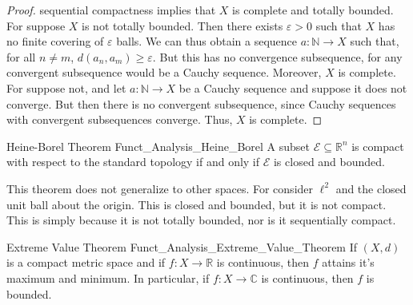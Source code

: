 \documentclass[crop=false,class=book,oneside]{standalone}                      %
\begin{document}
\begin{proof}
                sequential compactness implies that $X$ is
                complete and totally bounded. For suppose $X$ is
                not totally bounded. Then there exists
                $\varepsilon>0$ such that $X$ has no finite
                covering of $\varepsilon$ balls. We can thus
                obtain a sequence $a:\mathbb{N}\rightarrow{X}$
                such that, for all $n\ne{m}$,
                $d(a_{n},a_{m})\geq\varepsilon$. But this
                has no convergence subsequence, for any convergent
                subsequence would be a Cauchy sequence. Moreover,
                $X$ is complete. For suppose not, and let
                $a:\mathbb{N}\rightarrow{X}$ be a Cauchy sequence
                and suppose it does not converge. But then there
                is no convergent subsequence, since Cauchy
                sequences with convergent subsequences converge.
                Thus, $X$ is complete.
            \end{proof}
            \begin{ltheorem}{Heine-Borel Theorem}
                  {Funct_Analysis_Heine_Borel}
                A subset $\mathcal{E}\subseteq\mathbb{R}^{n}$ is
                compact with respect to the standard topology if and
                only if $\mathcal{E}$ is closed and bounded.
            \end{ltheorem}
            This theorem does not generalize to other spaces. For
            consider $\ell^{2}$ and the closed unit ball about the
            origin. This is closed and bounded, but it is not
            compact. This is simply because it is not totally
            bounded, nor is it sequentially compact.
            \begin{ltheorem}{Extreme Value Theorem}
                  {Funct_Analysis_Extreme_Value_Theorem}
                If $(X,d)$ is a compact metric space and if
                $f:X\rightarrow\mathbb{R}$ is continuous, then
                $f$ attains it's maximum and minimum. In particular,
                if $f:X\rightarrow\mathbb{C}$ is continuous, then
                $f$ is bounded.
            \end{ltheorem}
\end{document}
